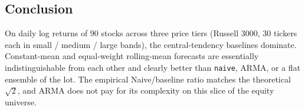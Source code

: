 \documentclass[10pt,a4paper,twocolumn]{article}
\begin{document}
\subsection{Conclusion}
On daily log returns of $90$ stocks across three price tiers (Russell 3000, $30$ tickers each in small / medium / large bands), the central-tendency baselines dominate. Constant-mean and equal-weight rolling-mean forecasts are essentially indistinguishable from each other and clearly better than \texttt{naive}, ARMA, or a flat ensemble of the lot. The empirical Naive/baseline ratio matches the theoretical $\sqrt{2}$, and ARMA does not pay for its complexity on this slice of the equity universe.
\end{document}
